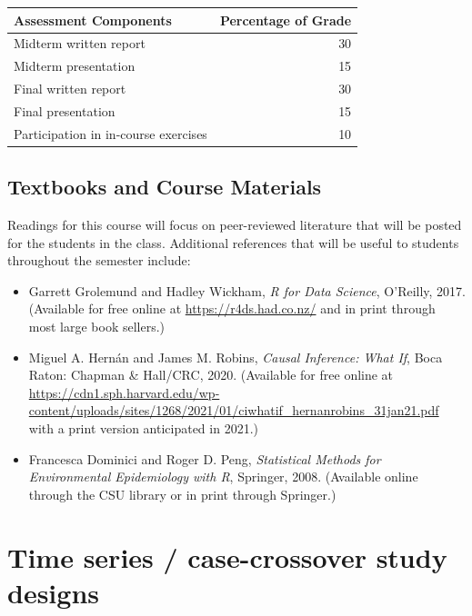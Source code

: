 \documentclass[
]{book}
\providecommand{\tightlist}{%
  \setlength{\itemsep}{0pt}\setlength{\parskip}{0pt}}
\begin{document}
\begin{tabular}{l|r}
\hline
Assessment Components & Percentage of Grade\\
\hline
Midterm written report & 30\\
\hline
Midterm presentation & 15\\
\hline
Final written report & 30\\
\hline
Final presentation & 15\\
\hline
Participation in in-course exercises & 10\\
\hline
\end{tabular}

\hypertarget{textbooks-and-course-materials}{%
\section{Textbooks and Course Materials}\label{textbooks-and-course-materials}}

Readings for this course will focus on peer-reviewed literature that will be
posted for the students in the class. Additional references that will be useful
to students throughout the semester include:

\begin{itemize}
\tightlist
\item
  Garrett Grolemund and Hadley Wickham, \emph{R for Data Science}, O'Reilly, 2017. (Available for free online at \url{https://r4ds.had.co.nz/} and in print through
  most large book sellers.)
\item
  Miguel A. Hernán and James M. Robins, \emph{Causal Inference: What If}, Boca Raton: Chapman \& Hall/CRC, 2020. (Available for free online at \url{https://cdn1.sph.harvard.edu/wp-content/uploads/sites/1268/2021/01/ciwhatif_hernanrobins_31jan21.pdf} with a print version anticipated in 2021.)
\item
  Francesca Dominici and Roger D. Peng, \emph{Statistical Methods for Environmental Epidemiology with R}, Springer, 2008. (Available online through the CSU library or in print through Springer.)
\end{itemize}

\hypertarget{time-series-case-crossover-study-designs}{%
\chapter{Time series / case-crossover study designs}\label{time-series-case-crossover-study-designs}}
\end{document}
